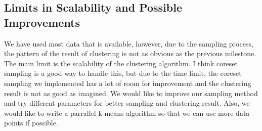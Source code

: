 \subsection{Limits in Scalability and Possible Improvements}
We have used most data that is available, however, due to the sampling process, the pattern of the result of clustering is not as obvious as the previous milestone. The main limit is the scalability of the clustering algorithm. I think coreset sampling is a good way to handle this, but due to the time limit, the coreset sampling we implemented has a lot of room for improvement and the clustering result is not as good as imagined. We would like to improve our sampling method and try different parameters for better sampling and clustering result. Also, we would like to write a parrallel k-means algorithm so that we can use more data points if possible.

